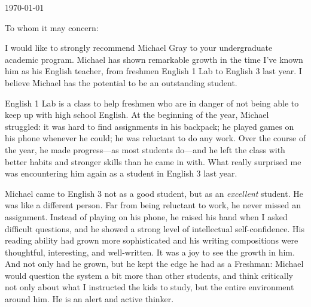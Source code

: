 \documentclass[11pt, letterpaper]{letter} %
\begin{document}

\begin{letter}{
	\today\\	
}


\opening{To whom it may concern:}

I would like to strongly recommend Michael Gray to your undergraduate academic program. Michael has shown remarkable growth in the time I've known him as his English teacher, from freshmen English 1 Lab to English 3 last year. I believe Michael has the potential to be an outstanding student.

English 1 Lab is a class to help freshmen who are in danger of not being able to keep up with high school English. At the beginning of the year, Michael struggled: it was hard to find assignments in his backpack; he played games on his phone whenever he could; he was reluctant to do any work. Over the course of the year, he made progress---as most students do---and he left the class with better habits and stronger skills than he came in with. What really surprised me was encountering him again as a student in English 3 last year.

Michael came to English 3 not as a good student, but as an \emph{excellent} student. He was like a different person. Far from being reluctant to work, he never missed an assignment. Instead of playing on his phone, he raised his hand when I asked difficult questions, and he showed a strong level of intellectual self-confidence. His reading ability had grown more sophisticated and his writing compositions were thoughtful, interesting, and well-written. It was a joy to see the growth in him. And not only had he grown, but he kept the edge he had as a Freshman: Michael would question the system a bit more than other students, and think critically not only about what I instructed the kids to study, but the entire environment around him. He is an alert and active thinker.


\end{letter}
\end{document}
